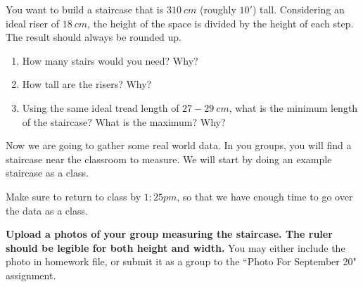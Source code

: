 \documentclass[handout,nooutcomes,noauthor,hints]{../ximera}
\begin{document}
\mynewpage

\begin{question}
 You want to build a staircase that is $310\ cm$ (roughly $10'$) tall. Considering an ideal riser of $18\ cm$, the height of the space is divided by the height of each step. The result should always be rounded up.
 
\begin{enumerate}
 \item How many stairs would you need? Why?
 \item How tall are the risers? Why?
 \item Using the same ideal tread length of $27-29\ cm$,  what is the minimum length of the staircase? What is the maximum? Why?
\end{enumerate}
\end{question}

\mynewpage

\begin{question}
 Now we are going to gather some real world data. In you groups, you will find a staircase near the classroom to measure. We will start by doing an example staircase as a class.
 
Make sure to return to class by $1:25pm$, so that we have enough time to go over the data as a class.
 
 \textbf{Upload a photos of your group measuring the staircase. The ruler should be legible for both height and width.} You may either include the photo in homework file, or submit it as a group to the ``Photo For September 20" assignment. 
 
\end{question}
\end{document}
